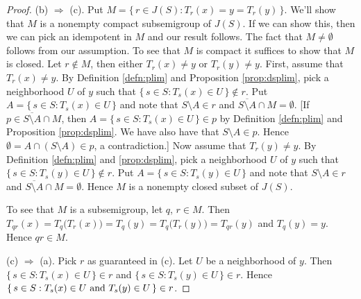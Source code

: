 \documentclass[12pt]{article}
\theoremstyle{plain}
\theoremstyle{definition}
\begin{document}
\begin{proof}
    (b) $\Rightarrow$ (c).
    Put $M  = \{\, r \in J(S) : T_r(x) = y = T_r(y) \,\}$. 
    We'll show that $M$ is a nonempty compact subsemigroup of $J(S)$. 
    If we can show this, then we can pick an idempotent in $M$ and our
    result follows.
    The fact that $M \ne \emptyset$ follows from our assumption. 
    To see that $M$ is compact it suffices to show that $M$ is
    closed. 
    Let $r \not\in M$, then either $T_r(x) \ne y$ or $T_r(y) \ne y$. 
    First, assume that $T_r(x) \ne y$. 
    By Definition \ref{defn:plim} and Proposition \ref{prop:dsplim},
    pick a
    neighborhood $U$ of $y$ such that 
    $\{\, s \in S : T_s(x) \in U \,\} \not\in r$.
    Put $A = \{\, s \in S : T_s(x) \in U \,\}$ and note that $S
    \setminus A \in r$ and $\overline{S \setminus A} \cap M =
    \emptyset$.
    [If $p \in \overline{S \setminus A} \cap M$, then $A = \{\, s \in
    S : T_s(x) \in U \,\} \in p$ by Definition \ref{defn:plim} and
    Proposition \ref{prop:dsplim}.
    We have also have that $S \setminus A \in p$.
    Hence $\emptyset = A \cap (S \setminus A) \in p$, a
    contradiction.]
    Now assume that $T_r(y) \ne y$. 
    By Definition \ref{defn:plim} and \ref{prop:dsplim}, pick a
    neighborhood $U$ of $y$ such that
    $\{\, s \in S : T_s(y) \in U \,\} \not\in r$.
    Put $A = \{\, s \in S : T_s(y) \in U \,\}$ and note that $S
    \setminus A \in r$ and $\overline{S \setminus A} \cap M =
    \emptyset$.
    Hence $M$ is a nonempty closed subset of $J(S)$.

    To see that $M$ is a subsemigroup, let $q$, $r \in M$.
    Then $T_{qr}(x) = T_q\bigl(T_r(x)\bigr) = T_q(y) =
    T_q\bigl(T_r(y)\bigr) = T_{qr}(y)$ and $T_q(y) = y$. 
    Hence $qr \in M$. 
    
    (c) $\Rightarrow$ (a).
    Pick $r$ as guaranteed in (c). 
    Let $U$ be a neighborhood of $y$. 
    Then $\{\, s \in S : T_s(x) \in U \,\} \in r$ and $\{\,  s \in S :
    T_s(y) \in U \,\} \in r$.
    Hence $\{\, s \in S : \hbox{$T_s(x) \in U$ and $T_s(y) \in U$}
    \,\} \in r$.  
  \end{proof}
\end{document}
